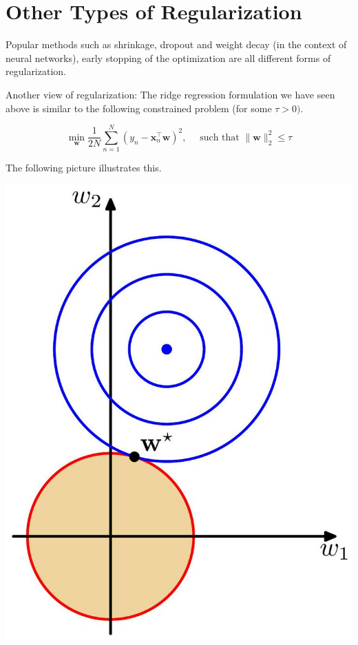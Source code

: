 \documentclass[10pt]{article}
\begin{document}
\section*{Other Types of Regularization}
Popular methods such as shrinkage, dropout and weight decay (in the context of neural networks), early stopping of the optimization are all different forms of regularization.

Another view of regularization: The ridge regression formulation we have seen above is similar to the following constrained problem (for some $\tau>0)$.

$$
\min _{\mathbf{w}} \frac{1}{2 N} \sum_{n=1}^{N}\left(y_{n}-\mathbf{x}_{n}^{\top} \mathbf{w}\right)^{2}, \quad \text { such that }\|\mathbf{w}\|_{2}^{2} \leq \tau
$$

The following picture illustrates this.

\begin{center}
\includegraphics[max width=\textwidth]{2023_12_30_0d309f6e07a388c2ea34g-09}
\end{center}
\end{document}
